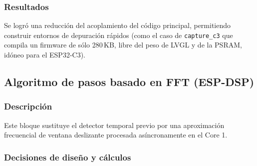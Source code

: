 \documentclass[letterpaper,11pt]{article}
\begin{document}
\subsubsection{Resultados}

Se logró una reducción del acoplamiento del código principal, permitiendo construir entornos de depuración rápidos (como el caso de \texttt{capture\_c3} que compila un firmware de sólo 280\,KB, libre del peso de LVGL y de la PSRAM, idóneo para el ESP32-C3).

\subsection{Algoritmo de pasos basado en FFT (ESP-DSP)}

\subsubsection{Descripción}

Este bloque sustituye el detector temporal previo por una aproximación frecuencial de ventana deslizante procesada asíncronamente en el Core 1.

\subsubsection{Decisiones de diseño y cálculos}
\end{document}
